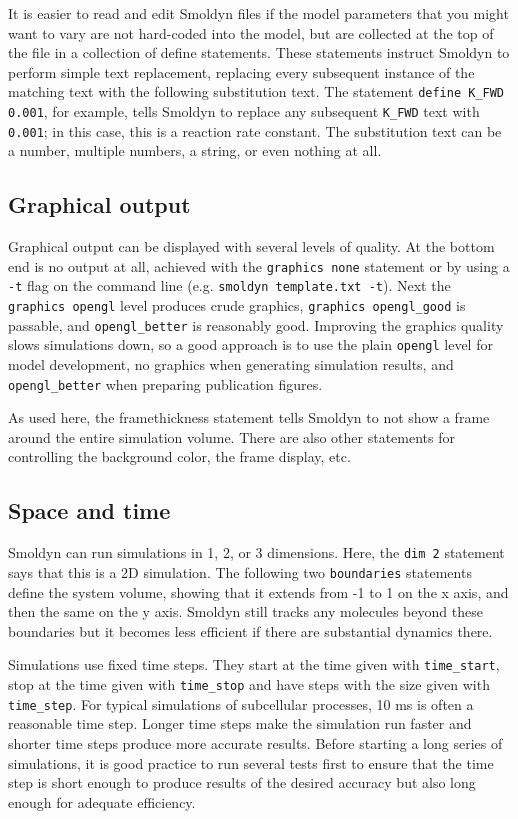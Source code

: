 \documentclass {scrbook}
\newcommand {\ttt} {\texttt}
\begin{document}
It is easier to read and edit Smoldyn files if the model parameters that you might want to vary are not hard-coded into the model, but are collected at the top of the file in a collection of define statements. These statements instruct Smoldyn to perform simple text replacement, replacing every subsequent instance of the matching text with the following substitution text. The statement  \ttt{define K\_FWD 0.001}, for example, tells Smoldyn to replace any subsequent  \ttt{K\_FWD} text with  \ttt{0.001}; in this case, this is a reaction rate constant. The substitution text can be a number, multiple numbers, a string, or even nothing at all.

\subsection*{Graphical output}

Graphical output can be displayed with several levels of quality. At the bottom end is no output at all, achieved with the  \ttt{graphics none} statement or by using a  \ttt{-t} flag on the command line (e.g.  \ttt{smoldyn template.txt -t}). Next the  \ttt{graphics opengl} level produces crude graphics,  \ttt{graphics opengl\_good} is passable, and  \ttt{opengl\_better} is reasonably good. Improving the graphics quality slows simulations down, so a good approach is to use the plain  \ttt{opengl} level for model development, no graphics when generating simulation results, and  \ttt{opengl\_better} when preparing publication figures.

As used here, the framethickness statement tells Smoldyn to not show a frame around the entire simulation volume. There are also other statements for controlling the background color, the frame display, etc.

\subsection*{Space and time}

Smoldyn can run simulations in 1, 2, or 3 dimensions. Here, the  \ttt{dim 2} statement says that this is a 2D simulation. The following two  \ttt{boundaries} statements define the system volume, showing that it extends from -1 to 1 on the x axis, and then the same on the y axis. Smoldyn still tracks any molecules beyond these boundaries but it becomes less efficient if there are substantial dynamics there.

Simulations use fixed time steps. They start at the time given with  \ttt{time\_start}, stop at the time given with  \ttt{time\_stop} and have steps with the size given with  \ttt{time\_step}. For typical simulations of subcellular processes, 10 ms is often a reasonable time step. Longer time steps make the simulation run faster and shorter time steps produce more accurate results. Before starting a long series of simulations, it is good practice to run several tests first to ensure that the time step is short enough to produce results of the desired accuracy but also long enough for adequate efficiency.
\end{document}
